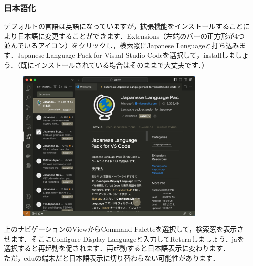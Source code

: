 \documentclass{jarticle}
\begin{document}
\subsubsection{日本語化}
デフォルトの言語は英語になっていますが，拡張機能をインストールすることにより日本語に変更することができます．Extensions（左端のバーの正方形が4つ並んでいるアイコン）をクリックし，検索窓にJapanese Languageと打ち込みます．Japanese Language Pack for Visual Studio Codeを選択して，installしましょう．（既にインストールされている場合はそのままで大丈夫です．）
\begin{figure}[H]
  \centering
  \includegraphics[height=7.5cm]{fig/VSCode2.png}
\end{figure}

上のナビゲーションのViewからCommand Paletteを選択して，検索窓を表示させます．そこにConfigure Display Languageと入力してReturnしましょう．jaを選択すると再起動を促されます．再起動すると日本語表示に変わります．\\
ただ，eduの端末だと日本語表示に切り替わらない可能性があります．
\end{document}
